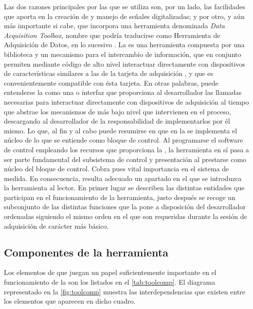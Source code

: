 Las dos razones principales por las que se utiliza \matlab{} son, por un
lado, las facilidades que aporta en la creación de \gui{} y manejo de
señales digitalizadas; y por otro, y aún más importante si cabe, que
incorpora una herramienta denominada \emph{Data Acquisition Toolbox},
nombre que podría traducirse como Herramienta de Adquisición de Datos, en
lo sucesivo . La \datx{} es una herramienta compuesta por una
biblioteca y un mecanismo para el intercambio de información, que en
conjunto permiten mediante código de alto nivel interactuar directamente
con dispositivos de características similares a las de la tarjeta de
adquisición \kpci{}, y que es convenientemente compatible con ésta tarjeta.
En otras palabras, puede entenderse la \datx{} como una  o
interfaz que proporciona al desarrollador las llamadas necesarias para
interactuar directamente con dispositivos de adquisición al tiempo que
abstrae los mecanismos de más bajo nivel que intervienen en el proceso,
descargando al desarrollador de la responsabilidad de implementarlos por él
mismo. Lo que, al fin y al cabo puede resumirse en que en la \datx{} se
implementa el núcleo de lo que se entiende como bloque de control. Al
programarse el software de control empleando los recursos que proporciona
la \datx{}, la herramienta en sí pasa a ser parte fundamental del
subsistema de control y presentación al prestarse como núcleo del bloque de
control. Cobra pues vital importancia en el sistema de medida. En
consecuencia, resulta adecuado un apartado en el que se introduzca la
herramienta al lector. En primer lugar se describen las distintas entidades
que participan en el funcionamiento de la herramienta, justo después se
recoge un subconjunto de las distintas funciones que la \datx{} pone a
disposición del desarrollador ordenadas siguiendo el mismo orden en el que
son requeridas durante la sesión de adquisición de carácter más básico.


\subsection{Componentes de la herramienta}

Los elementos de \matlab{} que juegan un papel suficientemente importante
en el funcionamiento de la \datx{} son los listados en el
\cref{tab:toolcomp}. El diagrama representado en la \vref{fig:toolcomp}
muestra las interdependencias que existen entre los elementos que aparecen
en dicho cuadro.

